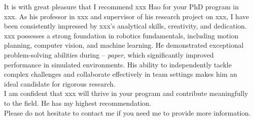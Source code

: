 It is with great pleasure that I recommend xxx Hao for your PhD program in xxx. As his professor in xxx and supervisor of his research project on xxx, I have been consistently impressed by xxx's analytical skills, creativity, and dedication.\\

xxx possesses a strong foundation in robotics fundamentals, including motion planning, computer vision, and machine learning. He demonstrated exceptional problem-solving abilities during -- \textit{paper}, which significantly improved performance in simulated environments. His ability to independently tackle complex challenges and collaborate effectively in team settings makes him an ideal candidate for rigorous research. \\
 
I am confident that xxx will thrive in your program and contribute meaningfully to the field. He has my highest recommendation. \\

Please do not hesitate to contact me if you need me to provide more information.